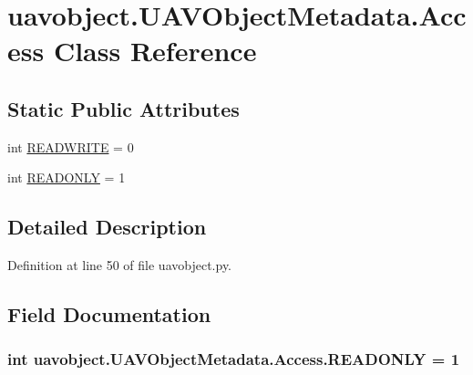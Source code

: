 \hypertarget{classuavobject_1_1_u_a_v_object_metadata_1_1_access}{\section{uavobject.\-U\-A\-V\-Object\-Metadata.\-Access Class Reference}
\label{classuavobject_1_1_u_a_v_object_metadata_1_1_access}
}
\subsection*{Static Public Attributes}
\begin{DoxyCompactItemize}
\item 
int \hyperlink{classuavobject_1_1_u_a_v_object_metadata_1_1_access_ad34b855419d508cfdbeb7a63feda9d23}{R\-E\-A\-D\-W\-R\-I\-T\-E} = 0
\item 
int \hyperlink{classuavobject_1_1_u_a_v_object_metadata_1_1_access_a7d3f180dba3769cbd619786fbb2262b2}{R\-E\-A\-D\-O\-N\-L\-Y} = 1
\end{DoxyCompactItemize}


\subsection{Detailed Description}


Definition at line 50 of file uavobject.\-py.



\subsection{Field Documentation}
\hypertarget{classuavobject_1_1_u_a_v_object_metadata_1_1_access_a7d3f180dba3769cbd619786fbb2262b2}{
\subsubsection[{R\-E\-A\-D\-O\-N\-L\-Y}]{\setlength{\rightskip}{0pt plus 5cm}int uavobject.\-U\-A\-V\-Object\-Metadata.\-Access.\-R\-E\-A\-D\-O\-N\-L\-Y = 1\hspace{0.3cm}{\ttfamily [static]}}}\label{classuavobject_1_1_u_a_v_object_metadata_1_1_access_a7d3f180dba3769cbd619786fbb2262b2}


